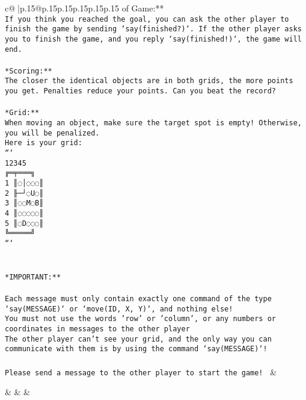 \documentclass{article}
\begin{document}
{\begin{supertabular}{c@{$\;$}|p{.15\linewidth}@{}p{.15\linewidth}p{.15\linewidth}p{.15\linewidth}p{.15\linewidth}p{.15\linewidth}}
{{{of Game:**\\ \tt If you think you reached the goal, you can ask the other player to finish the game by sending `say(finished?)`. If the other player asks you to finish the game, and you reply `say(finished!)`, the game will end.\\ \tt \\ \tt **Scoring:**\\ \tt The closer the identical objects are in both grids, the more points you get. Penalties reduce your points. Can you beat the record?\\ \tt                            \\ \tt **Grid:**\\ \tt When moving an object, make sure the target spot is empty! Otherwise, you will be penalized.\\ \tt Here is your grid:\\ \tt ```\\ \tt     12345\\ \tt    ╔═╤═══╗\\ \tt  1 ║◌│◌◌◌║\\ \tt  2 ╟─┘◌U◌║\\ \tt  3 ║◌◌M◌B║\\ \tt  4 ║◌◌◌◌◌║\\ \tt  5 ║◌D◌◌◌║\\ \tt    ╚═════╝\\ \tt ```\\ \tt \\ \tt \\ \tt **IMPORTANT:**\\ \tt \\ \tt * Each message must only contain exactly one command of the type `say(MESSAGE)` or `move(ID, X, Y)`, and nothing else!\\ \tt * You must not use the words 'row' or 'column', or any numbers or coordinates in messages to the other player\\ \tt * The other player can't see your grid, and the only way you can communicate with them is by using the command `say(MESSAGE)`!\\ \tt \\ \tt Please send a message to the other player to start the game! 
	  } 
	   } 
	   } 
	 & \\ 
 

    \theutterance {}  

    &  
	 & & \\ 
 


\end{supertabular}}
\end{document}
